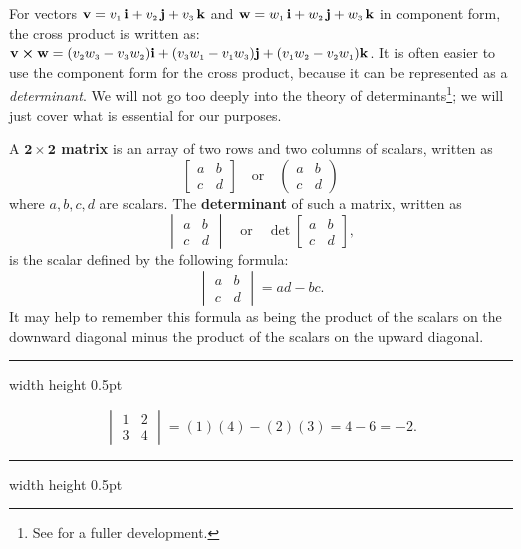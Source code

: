 For vectors $\textbf{v} = v_{\scriptscriptstyle 1}\,\textbf{i} + v_{\scriptscriptstyle 2}\,\textbf{j} + v_{\scriptscriptstyle 3}\,\textbf{k}$ and $\textbf{w} = w_{\scriptscriptstyle 1}\,\textbf{i} + w_{\scriptscriptstyle 2}\,\textbf{j} + w_{\scriptscriptstyle 3}\,\textbf{k}$ in component form, the cross
product is written as: $\textbf{v} \bm{\times} \textbf{w} = (v_{\scriptscriptstyle 2}w_{\scriptscriptstyle 3} -
v_{\scriptscriptstyle 3}w_{\scriptscriptstyle 2})\textbf{i} + (v_{\scriptscriptstyle 3}w_{\scriptscriptstyle 1} - v_{\scriptscriptstyle 1}w_{\scriptscriptstyle 3})\textbf{j} +
(v_{\scriptscriptstyle 1}w_{\scriptscriptstyle 2} - v_{\scriptscriptstyle 2}w_{\scriptscriptstyle 1})\textbf{k}$.
It is often easier to use the component form for the cross product, because it can be represented as a
\emph{determinant}. We will not go too deeply into the theory of determinants\footnote{See \cite{ar}
for a fuller development.}; we will just cover what is essential for our purposes.

A \textbf{$\bm{2 \times 2}$ matrix} is an array of two rows and two columns of scalars, written as
\begin{displaymath}
 \begin{bmatrix}
  a & b\\
  c & d
 \end{bmatrix}
 \quad\text{or}\quad
 \begin{pmatrix}
  a & b\\
  c & d
 \end{pmatrix}
\end{displaymath}
where $a, b, c, d$ are scalars. 
The \textbf{determinant} of such a matrix, written as
\begin{displaymath}
 \begin{vmatrix}
  a & b\\
  c & d
 \end{vmatrix}
 \quad\text{or}\quad
 \det \begin{bmatrix}
  a & b\\
  c & d
 \end{bmatrix},
\end{displaymath}
is the scalar defined by the following formula:
\begin{displaymath}
 \begin{vmatrix}
  a & b\\
  c & d
 \end{vmatrix}
 = ad - bc.
\end{displaymath}
It may help to remember this formula as being the product of the scalars on the downward diagonal minus the product of
the scalars on the upward diagonal.

\medskip
\hrule width \textwidth height 0.5pt
\begin{exmp}
 \begin{displaymath}
  \begin{vmatrix}
   1 & 2\\
   3 & 4
  \end{vmatrix}
  = (1)(4) - (2)(3) = 4 - 6 = -2.
 \end{displaymath}
\end{exmp}
\hrule width \textwidth height 0.5pt
\medskip

